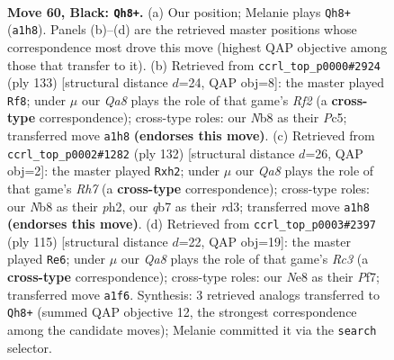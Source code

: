 \documentclass[11pt]{article}
\begin{document}
\clearpage

\begin{figure}[p]\centering
\begin{subfigure}{0.46\textwidth}\centering
\resizebox{\linewidth}{!}{%
\newchessgame
\chessboard[
  setfen={1n1kn3/1Q6/8/8/P7/7K/3N4/q7 b - - 4 60},
  showmover=false,
  pgfstyle=straightmove, color=movearrow, markmove={a1-h8}
]}
\caption{}
\end{subfigure}\hfill
\begin{subfigure}{0.46\textwidth}\centering
\resizebox{\linewidth}{!}{%
\newchessgame
\chessboard[
  setfen={8/5r2/1Q6/2p5/2k5/2n3K1/8/8 b - - 18 67},
  showmover=false,
  pgfstyle=straightmove, color=movearrow, markmove={f7-f8}
]}
\caption{}
\end{subfigure}
\\[4pt]
\begin{subfigure}{0.46\textwidth}\centering
\resizebox{\linewidth}{!}{%
\newchessgame
\chessboard[
  setfen={8/7R/1k3K2/5Np1/8/3r4/7p/8 w - - 0 67},
  showmover=false,
  pgfstyle=straightmove, color=movearrow, markmove={h7-h2}
]}
\caption{}
\end{subfigure}\hfill
\begin{subfigure}{0.46\textwidth}\centering
\resizebox{\linewidth}{!}{%
\newchessgame
\chessboard[
  setfen={8/5p1k/2r2n2/6Q1/8/5K1P/8/8 b - - 2 58},
  showmover=false,
  pgfstyle=straightmove, color=movearrow, markmove={c6-e6}
]}
\caption{}
\end{subfigure}
\caption{\textbf{Move 60, Black: \texttt{Qh8+}.} (a) Our position; Melanie plays \texttt{Qh8+} (\texttt{a1h8}). Panels (b)--(d) are the retrieved master positions whose correspondence most drove this move (highest QAP objective among those that transfer to it). (b) Retrieved from \texttt{ccrl\_top\_p0000\#2924} (ply 133) [structural distance $d$=24, QAP obj=8]: the master played \texttt{Rf8}; under $\mu$ our \emph{Qa8} plays the role of that game's \emph{Rf2} (a \textbf{cross-type} correspondence); cross-type roles: our \emph{N}b8 as their \emph{P}c5; transferred move \texttt{a1h8} \textbf{(endorses this move)}. (c) Retrieved from \texttt{ccrl\_top\_p0002\#1282} (ply 132) [structural distance $d$=26, QAP obj=2]: the master played \texttt{Rxh2}; under $\mu$ our \emph{Qa8} plays the role of that game's \emph{Rh7} (a \textbf{cross-type} correspondence); cross-type roles: our \emph{N}b8 as their \emph{p}h2, our \emph{q}b7 as their \emph{r}d3; transferred move \texttt{a1h8} \textbf{(endorses this move)}. (d) Retrieved from \texttt{ccrl\_top\_p0003\#2397} (ply 115) [structural distance $d$=22, QAP obj=19]: the master played \texttt{Re6}; under $\mu$ our \emph{Qa8} plays the role of that game's \emph{Rc3} (a \textbf{cross-type} correspondence); cross-type roles: our \emph{N}e8 as their \emph{P}f7; transferred move \texttt{a1f6}. Synthesis: 3 retrieved analogs transferred to \texttt{Qh8+} (summed QAP objective 12, the strongest correspondence among the candidate moves); Melanie committed it via the \texttt{search} selector.}
\label{fig:thought-m119}
\end{figure}
\end{document}
